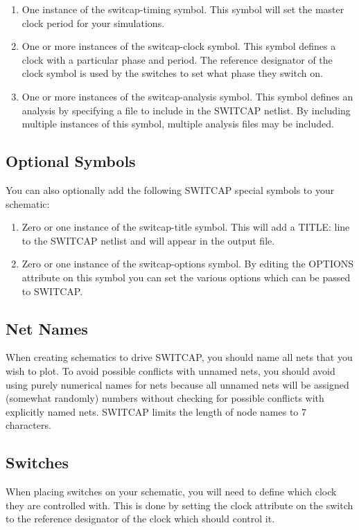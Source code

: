 \documentclass{article}
\begin{document}
\begin{enumerate}
\item One instance of the switcap-timing symbol.  This symbol will set the
  master clock period for your simulations.
  
\item One or more instances of the switcap-clock symbol.  This symbol
  defines a clock with a particular phase and period.  The reference
  designator of the clock symbol is used by the switches to set what
  phase they switch on.

\item One or more instances of the switcap-analysis symbol.  This symbol
  defines an analysis by specifying a file to include in the SWITCAP
  netlist.  By including multiple instances of this symbol, multiple
  analysis files may be included.

\end{enumerate}

\subsection{Optional Symbols}
You can also optionally add the following SWITCAP special symbols to
your schematic:

\begin{enumerate}
\item Zero or one instance of the switcap-title symbol.  This will add a
  TITLE: line to the SWITCAP netlist and will appear in the output
  file.

\item Zero or one instance of the switcap-options symbol.  By editing the
  OPTIONS attribute on this symbol you can set the various options
  which can be passed to SWITCAP.
\end{enumerate}

\subsection{Net Names}
When creating schematics to drive SWITCAP, you should name all nets
that you wish to plot.  To avoid possible conflicts with unnamed nets,
you should avoid using purely numerical names for nets because
all unnamed nets will be assigned (somewhat randomly) numbers without
checking for possible conflicts with explicitly named nets.
SWITCAP limits the length of node names to 7 characters.

\subsection{Switches}
When placing switches on your schematic, you will need to define
which clock they are controlled with.  This is done by setting
the clock attribute on the switch to the reference designator 
of the clock which should control it.
\end{document}
